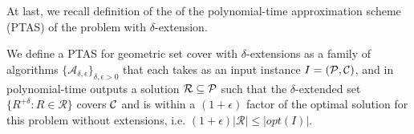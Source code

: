 At last, we recall definition of the of the
polynomial-time approximation scheme (PTAS) of
the problem with $\delta$-extension.

\begin{defi}
We define a PTAS for geometric set cover 
with $\delta$-extensions as a family of algorithms
$\{\mathcal{A}_{\delta, \epsilon}\}_{\delta, \epsilon > 0}$ that
each takes as an input instance $I=(\mathcal{P}, \mathcal{C})$,
and in polynomial-time outputs a solution $\mathcal{R} \subseteq \mathcal{P}$
such that the $\delta$-extended set
$\{ R^{+\delta} :  R \in \mathcal{R} \}$ covers $\mathcal{C}$
and is within a $(1+\epsilon)$ factor of the optimal
solution for this problem without
extensions, i.e. $(1+\epsilon)|\mathcal{R}| \le |opt(I)|$.

\end{defi}
